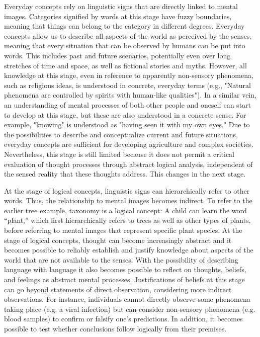 \documentclass[authordate, reflection, issue]{jote-new-article}
\begin{document}
	







	Everyday concepts rely on linguistic signs that are directly linked to mental images. Categories signified by words at this stage have fuzzy boundaries, meaning that things can belong to the category in different degrees. Everyday concepts allow us to describe all aspects of the world as perceived by the senses, meaning that every situation that can be observed by humans can be put into words. This includes past and future scenarios, potentially even over long stretches of time and space, as well as fictional stories and myths. However, all knowledge at this stage, even in reference to apparently non-sensory phenomena, such as religious ideas, is understood in concrete, everyday terms (e.g., "Natural phenomena are controlled by spirits with human-like qualities"). In a similar vein, an understanding of mental processes of both other people and oneself can start to develop at this stage, but these are also understood in a concrete sense. For example, "knowing" is understood as "having seen it with my own eyes." Due to the possibilities to describe and conceptualize current and future situations, everyday concepts are sufficient for developing agriculture and complex societies. Nevertheless, this stage is still limited because it does not permit a critical evaluation of thought processes through abstract logical analysis, independent of the sensed reality that these thoughts address. This changes in the next stage.



	At the stage of logical concepts, linguistic signs can hierarchically refer to other words. Thus, the relationship to mental images becomes indirect. To refer to the earlier tree example, taxonomy is a logical concept: A child can learn the word “plant,” which first hierarchically refers to trees as well as other types of plants, before referring to mental images that represent specific plant species. At the stage of logical concepts, thought can become increasingly abstract and it becomes possible to reliably establish and justify knowledge about aspects of the world that are not available to the senses. With the possibility of describing language with language it also becomes possible to reflect on thoughts, beliefs, and feelings as abstract mental processes. Justifications of beliefs at this stage can go beyond statements of direct observation, considering more indirect observations. For instance, individuals cannot directly observe some phenomena taking place (e.g. a viral infection) but can consider non-sensory phenomena (e.g. blood samples) to confirm or falsify one's predictions. In addition, it becomes possible to test whether conclusions follow logically from their premises.
\end{document}

